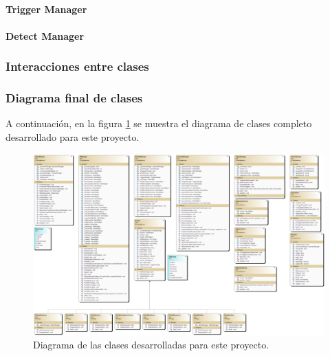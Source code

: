 \paragraph{Trigger Manager}

\paragraph{Detect Manager}









\subsubsection{Interacciones entre clases}

\subsubsection{Diagrama final de clases}

A continuación, en la figura \ref{fig:diagramaClases} se muestra el diagrama de clases completo desarrollado para este proyecto.

\begin{figure}[H]
	\centering
	\includegraphics[width=1.5\textwidth, angle=-90]{04.Desarrollo/05.Entrega5/01.Iteracion5_1/00.Figuras/09.diagrama_clases.png}
	\caption{Diagrama de las clases desarrolladas para este proyecto.}
	\label{fig:diagramaClases}
\end{figure}






